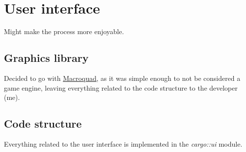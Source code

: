 
\section{User interface}

Might make the process more enjoyable.

\subsection{Graphics library}

Decided to go with \href{https://macroquad.rs/}{Macroquad}, as it was simple enough to not be considered a game engine,
leaving everything related to the code structure to the developer (me).

\subsection{Code structure}

Everything related to the user interface is implemented in the \textit{cargo::ui} module.